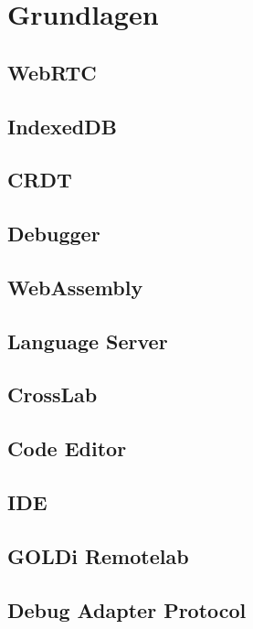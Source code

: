 \chapter{Grundlagen} \label{grundlagen}

\section{WebRTC}


\section{IndexedDB}


\section{CRDT}


\section{Debugger}


\section{WebAssembly}


\section{Language Server}


\section{CrossLab}


\section{Code Editor}


\section{IDE}


\section{GOLDi Remotelab}


\section{Debug Adapter Protocol}